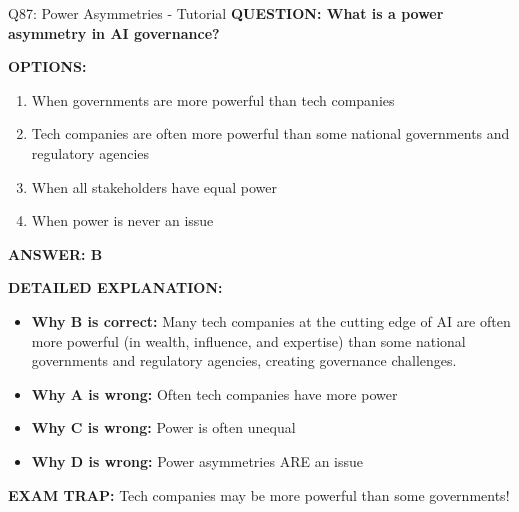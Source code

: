\documentclass[8pt]{beamer}
\begin{document}
	\begin{frame}{Q87: Power Asymmetries - Tutorial}
		\fontsize{6.5}{7.5}\selectfont
		\textbf{QUESTION: What is a power asymmetry in AI governance?}
		
		\vspace{0.1cm}
		\textbf{OPTIONS:}
		\begin{enumerate}
			\item When governments are more powerful than tech companies
			\item Tech companies are often more powerful than some national governments and regulatory agencies
			\item When all stakeholders have equal power
			\item When power is never an issue
		\end{enumerate}
		
		\vspace{0.1cm}
		\textcolor{myblue}{\textbf{ANSWER: B}}
		
		\vspace{0.1cm}
		\textbf{DETAILED EXPLANATION:}
		\begin{itemize}
			\item \textbf{Why B is correct:} Many tech companies at the cutting edge of AI are often more powerful (in wealth, influence, and expertise) than some national governments and regulatory agencies, creating governance challenges.
			\item \textbf{Why A is wrong:} Often tech companies have more power
			\item \textbf{Why C is wrong:} Power is often unequal
			\item \textbf{Why D is wrong:} Power asymmetries ARE an issue
		\end{itemize}
		
		\textcolor{myred}{\textbf{EXAM TRAP:}} Tech companies may be \textcolor{myblue}{more powerful than some governments}!
	\end{frame}
	
\end{document}
